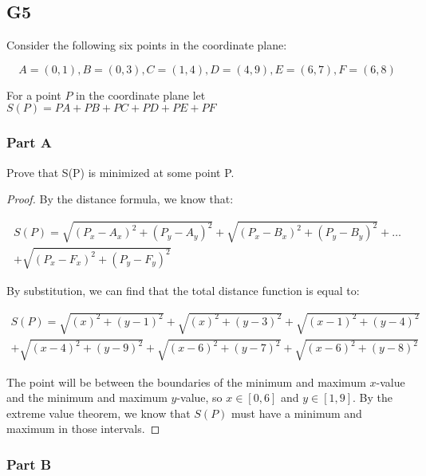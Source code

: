 \subsection*{G5}

Consider the following six points in the coordinate plane:

\begin{equation*}
A = (0,1), B = (0,3), C = (1,4), D = (4,9), E = (6,7), F = (6,8)
\end{equation*}

For a point $P$ in the coordinate plane let $S(P) = PA + PB + PC + PD + PE + PF$

\subsubsection*{Part A}

Prove that S(P) is minimized at some point P.

\begin{proof}
    By the distance formula, we know that:
    
    \begin{multline*}
        S(P) = \sqrt{(P_x - A_x)^2 + (P_y - A_y)^2} + \sqrt{(P_x - B_x)^2 + (P_y - B_y)^2} + \dots \\
        + \sqrt{(P_x - F_x)^2 + (P_y - F_y)^2}
    \end{multline*}

    By substitution, we can find that the total distance function is equal to:

    \begin{multline}
        S(P) = \sqrt{(x)^2 + (y - 1)^2} + \sqrt{(x)^2 + (y - 3)^2} + \sqrt{(x - 1)^2 + (y - 4)^2} \\
        + \sqrt{(x - 4)^2 + (y - 9)^2} + \sqrt{(x - 6)^2 + (y - 7)^2} + \sqrt{(x - 6)^2 + (y - 8)^2}
    \end{multline}

    The point will be between the boundaries of the minimum and maximum $x$-value and the minimum and maximum $y$-value, so $x \in [0, 6]$ and $y \in [1,9]$. By the extreme value theorem, we know that $S(P)$ must have a minimum and maximum in those intervals. 

\end{proof}

\subsubsection*{Part B}

